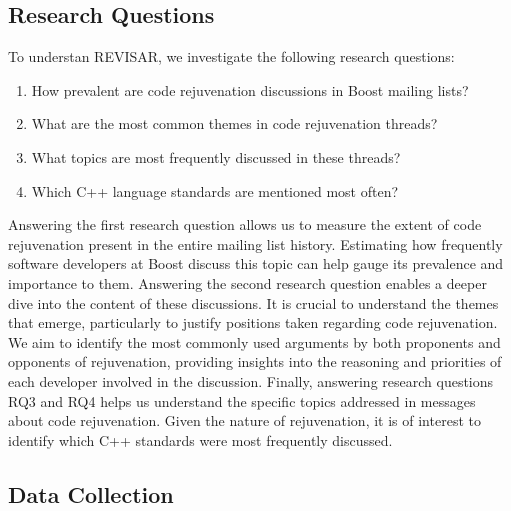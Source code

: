 \subsection{Research Questions}

To understan {\color{red}REVISAR}, we investigate the following research questions:

\begin{enumerate}[(RQ1)]
  \item How prevalent are code rejuvenation discussions in Boost mailing lists?
  \item What are the most common themes in code rejuvenation threads?
  \item What topics are most frequently discussed in these threads?
  \item Which C++ language standards are mentioned most often?
\end{enumerate}


Answering the first research question allows us to measure the extent of code rejuvenation present in the entire mailing list history. Estimating how frequently software developers at Boost discuss this topic can help gauge its prevalence and importance to them.
Answering the second research question enables a deeper dive into the content of these discussions. It is crucial to understand the themes that emerge, particularly to justify positions taken regarding code rejuvenation. We aim to identify the most commonly used arguments by both proponents and opponents of rejuvenation, providing insights into the reasoning and priorities of each developer involved in the discussion. Finally, answering research questions RQ3 and RQ4 helps us understand the specific topics addressed in messages about code rejuvenation. Given the nature of rejuvenation, it is of interest to identify which C++ standards were most frequently discussed.

\subsection{Data Collection}




